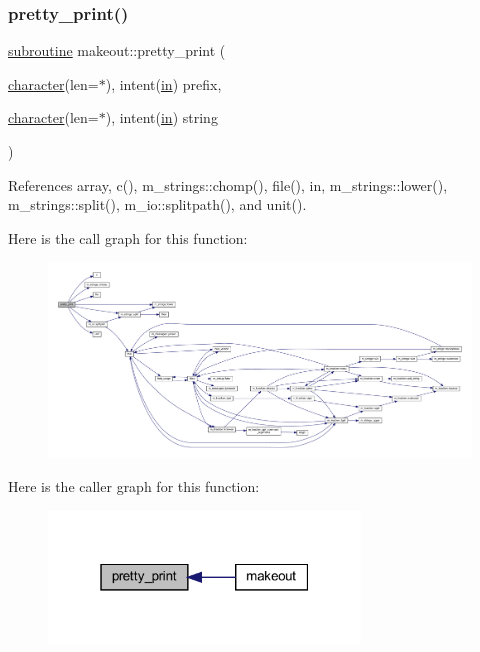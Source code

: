 \subsubsection{\texorpdfstring{pretty\+\_\+print()}{pretty\_print()}}
{\footnotesize\ttfamily \hyperlink{M__stopwatch_83_8txt_acfbcff50169d691ff02d4a123ed70482}{subroutine} makeout\+::pretty\+\_\+print (\begin{DoxyParamCaption}\item[{\hyperlink{option__stopwatch_83_8txt_abd4b21fbbd175834027b5224bfe97e66}{character}(len=$\ast$), intent(\hyperlink{M__journal_83_8txt_afce72651d1eed785a2132bee863b2f38}{in})}]{prefix,  }\item[{\hyperlink{option__stopwatch_83_8txt_abd4b21fbbd175834027b5224bfe97e66}{character}(len=$\ast$), intent(\hyperlink{M__journal_83_8txt_afce72651d1eed785a2132bee863b2f38}{in})}]{string }\end{DoxyParamCaption})}



References array, c(), m\+\_\+strings\+::chomp(), file(), in, m\+\_\+strings\+::lower(), m\+\_\+strings\+::split(), m\+\_\+io\+::splitpath(), and unit().

Here is the call graph for this function\+:
\nopagebreak
\begin{figure}[H]
\begin{center}
\leavevmode
\includegraphics[width=350pt]{makeout_8f90_a19d72934b25646092ee224d98550892a_cgraph}
\end{center}
\end{figure}
Here is the caller graph for this function\+:
\nopagebreak
\begin{figure}[H]
\begin{center}
\leavevmode
\includegraphics[width=235pt]{makeout_8f90_a19d72934b25646092ee224d98550892a_icgraph}
\end{center}
\end{figure}
\mbox{\label{makeout_8f90_a7a3ba6914f570677e23fd8754a666107}} 
